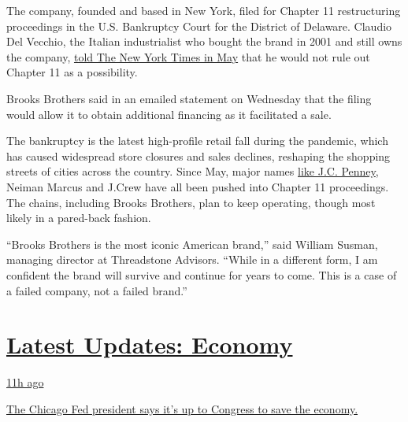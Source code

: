 The company, founded and based in New York, filed for Chapter 11
restructuring proceedings in the U.S. Bankruptcy Court for the District
of Delaware. Claudio Del Vecchio, the Italian industrialist who bought
the brand in 2001 and still owns the company,
\href{https://www.nytimes3xbfgragh.onion/2020/06/05/business/brooks-brothers-factory-closings.html}{told
The New York Times in May} that he would not rule out Chapter 11 as a
possibility.

Brooks Brothers said in an emailed statement on Wednesday that the
filing would allow it to obtain additional financing as it facilitated a
sale.

The bankruptcy is the latest high-profile retail fall during the
pandemic, which has caused widespread store closures and sales declines,
reshaping the shopping streets of cities across the country. Since May,
major names
\href{https://www.nytimes3xbfgragh.onion/2020/05/15/business/jc-penney-bankruptcy-coronavirus.html}{like
J.C. Penney}, Neiman Marcus and J.Crew have all been pushed into Chapter
11 proceedings. The chains, including Brooks Brothers, plan to keep
operating, though most likely in a pared-back fashion.

``Brooks Brothers is the most iconic American brand,'' said William
Susman, managing director at Threadstone Advisors. ``While in a
different form, I am confident the brand will survive and continue for
years to come. This is a case of a failed company, not a failed brand.''

\hypertarget{latest-updates-economy}{%
\section{\texorpdfstring{\href{https://www.nytimes3xbfgragh.onion/live/2020/08/03/business/stock-market-today-coronavirus?action=click\&pgtype=Article\&state=default\&region=MAIN_CONTENT_1\&context=storylines_live_updates}{Latest
Updates:
Economy}}{Latest Updates: Economy}}\label{latest-updates-economy}}

\href{https://www.nytimes3xbfgragh.onion/live/2020/08/03/business/stock-market-today-coronavirus?action=click\&pgtype=Article\&state=default\&region=MAIN_CONTENT_1\&context=storylines_live_updates\#the-chicago-fed-president-says-its-up-to-congress-to-save-the-economy}{11h
ago}

\href{https://www.nytimes3xbfgragh.onion/live/2020/08/03/business/stock-market-today-coronavirus?action=click\&pgtype=Article\&state=default\&region=MAIN_CONTENT_1\&context=storylines_live_updates\#the-chicago-fed-president-says-its-up-to-congress-to-save-the-economy}{The
Chicago Fed president says it's up to Congress to save the economy.}

